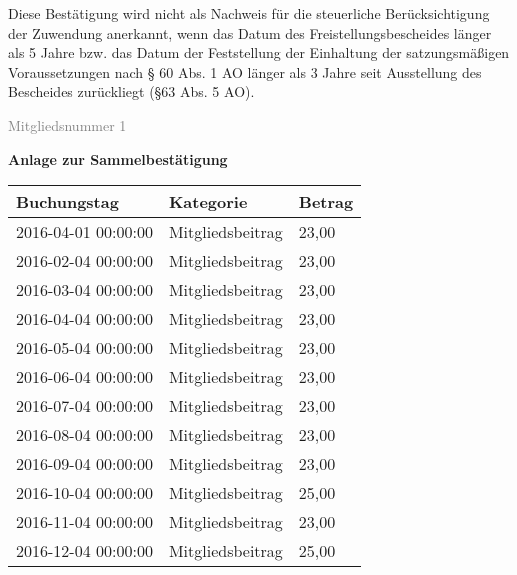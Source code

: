 \documentclass[11pt,ngerman]{scrartcl}
\begin{document}
Diese Bestätigung wird nicht als Nachweis für die steuerliche Berücksichtigung der Zuwendung anerkannt, wenn das Datum des Freistellungsbescheides länger als 5 Jahre bzw. das Datum der Feststellung der Einhaltung der satzungsmäßigen Voraussetzungen nach § 60 Abs. 1 AO länger als 3 Jahre seit Ausstellung des Bescheides zurückliegt (§63 Abs. 5 AO). 

\vfill \footnotesize{\textcolor{gray}{Mitgliedsnummer 1}}

\clearpage

{\bfseries\large Anlage zur Sammelbestätigung} \vspace*{2em}


\begin{tabular}{lll}
\toprule
         Buchungstag &         Kategorie & Betrag \\
\midrule
 2016-04-01 00:00:00 &  Mitgliedsbeitrag &  23,00 \\
 2016-02-04 00:00:00 &  Mitgliedsbeitrag &  23,00 \\
 2016-03-04 00:00:00 &  Mitgliedsbeitrag &  23,00 \\
 2016-04-04 00:00:00 &  Mitgliedsbeitrag &  23,00 \\
 2016-05-04 00:00:00 &  Mitgliedsbeitrag &  23,00 \\
 2016-06-04 00:00:00 &  Mitgliedsbeitrag &  23,00 \\
 2016-07-04 00:00:00 &  Mitgliedsbeitrag &  23,00 \\
 2016-08-04 00:00:00 &  Mitgliedsbeitrag &  23,00 \\
 2016-09-04 00:00:00 &  Mitgliedsbeitrag &  23,00 \\
 2016-10-04 00:00:00 &  Mitgliedsbeitrag &  25,00 \\
 2016-11-04 00:00:00 &  Mitgliedsbeitrag &  23,00 \\
 2016-12-04 00:00:00 &  Mitgliedsbeitrag &  25,00 \\
\bottomrule
\end{tabular}
\end{document}
